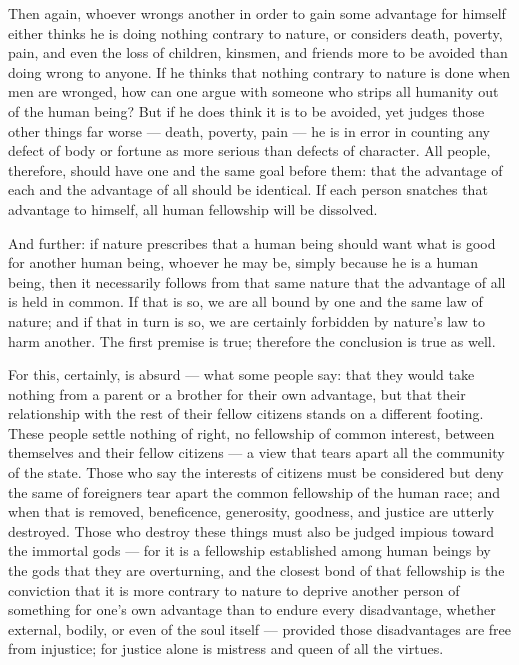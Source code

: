  Then again, whoever wrongs another in order to gain some advantage for himself either thinks he is doing nothing contrary to nature, or considers death, poverty, pain, and even the loss of children, kinsmen, and friends more to be avoided than doing wrong to anyone. If he thinks that nothing contrary to nature is done when men are wronged, how can one argue with someone who strips all humanity out of the human being? But if he does think it is to be avoided, yet judges those other things far worse — death, poverty, pain — he is in error in counting any defect of body or fortune as more serious than defects of character. All people, therefore, should have one and the same goal before them: that the advantage of each and the advantage of all should be identical. If each person snatches that advantage to himself, all human fellowship will be dissolved.

 And further: if nature prescribes that a human being should want what is good for another human being, whoever he may be, simply because he is a human being, then it necessarily follows from that same nature that the advantage of all is held in common. If that is so, we are all bound by one and the same law of nature; and if that in turn is so, we are certainly forbidden by nature's law to harm another. The first premise is true; therefore the conclusion is true as well.

 For this, certainly, is absurd — what some people say: that they would take nothing from a parent or a brother for their own advantage, but that their relationship with the rest of their fellow citizens stands on a different footing. These people settle nothing of right, no fellowship of common interest, between themselves and their fellow citizens — a view that tears apart all the community of the state. Those who say the interests of citizens must be considered but deny the same of foreigners tear apart the common fellowship of the human race; and when that is removed, beneficence, generosity, goodness, and justice are utterly destroyed. Those who destroy these things must also be judged impious toward the immortal gods — for it is a fellowship established among human beings by the gods that they are overturning, and the closest bond of that fellowship is the conviction that it is more contrary to nature to deprive another person of something for one's own advantage than to endure every disadvantage, whether external, bodily, or even of the soul itself — provided those disadvantages are free from injustice; for justice alone is mistress and queen of all the virtues.

